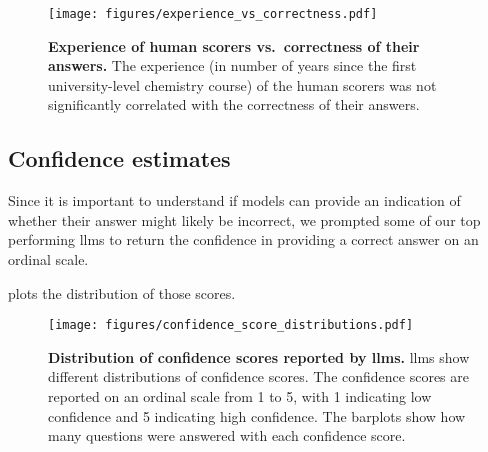 \begin{figure}[htb]
    \centering
    \texttt{[image: figures/experience\_vs\_correctness.pdf]}
    \label{fig:experience_vs_correctness}
    \caption{\textbf{Experience of human  scorers vs.\ correctness of their answers.} The experience (in number of years since the first university-level chemistry course) of the human scorers was not significantly correlated with the correctness of their answers.}
\end{figure}


\subsection{Confidence estimates} \label{sec:confidence_estimates}

Since it is important to understand if models can provide an indication of whether their answer might likely be incorrect, we prompted some of our top performing \glspl{llm} to return the confidence in providing a correct answer on an ordinal scale. 

 plots the distribution of those scores.

\begin{figure}[htb] 
    \centering
    \texttt{[image: figures/confidence\_score\_distributions.pdf]}
    \caption{\textbf{Distribution of confidence scores reported by \glspl{llm}.} \Glspl{llm} show different distributions of confidence scores. The confidence scores are reported on an ordinal scale from 1 to 5, with 1 indicating low confidence and 5 indicating high confidence. The barplots show how many questions were answered with each confidence score.}
    \label{fig:confidence_score_distributions}
\end{figure}


\clearpage

\printnoidxglossary[type=\acronymtype, nonumberlist]  %